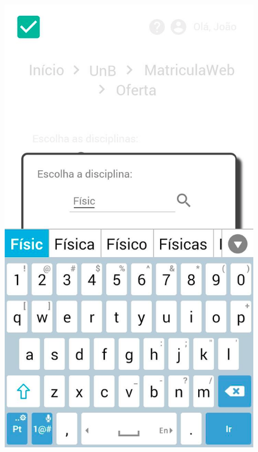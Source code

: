 \begin{figure}[h!]
{      \includegraphics[keepaspectratio=true, scale=0.2]{figuras/mob25.png}
   }
    
\end{figure}

